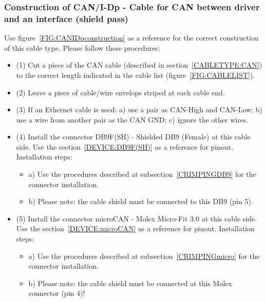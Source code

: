 \subsubsection{Construction of CAN/I-Dp - Cable for CAN between driver and an interface (shield pass)} \label{CONSTRUCTION:CANIDp}
Use figure~\ref{FIG:CANIDpconstruction} as a reference for the correct construction of this cable type. Please follow these procedures:
\begin{itemize}
  \item (1) Cut a piece of the CAN cable (described in section~\ref{CABLETYPE:CAN}) to the correct length indicated in the cable list (figure~\ref{FIG:CABLELIST}).
  \item (2) Leave a piece of cable/wire envelops striped at each cable end.
  \item (3) If an Ethernet cable is used: a) use a pair as CAN-High and CAN-Low; b) use a wire from another pair as the CAN GND; c) ignore the other wires.
  \item (4) Install the connector DB9F(SH) - Shielded DB9 (Female) at this cable side. Use the section~\ref{DEVICE:DB9F(SH)} as a reference for pinout. Installation steps:
  \begin{itemize}
    \item a) Use the procedures described at subsection~\ref{CRIMPINGDB9} for the connector installation.
    \item b) Please note: the cable shield must be connected to this DB9 (pin 5).
  \end{itemize}
  \item (5) Install the connector microCAN - Molex Micro-Fit 3.0 at this cable side. Use the section~\ref{DEVICE:microCAN} as a reference for pinout. Installation steps:
  \begin{itemize}
    \item a) Use the procedures described at subsection~\ref{CRIMPINGmicro} for the connector installation.
    \item b) Please note: the cable shield must be connected at this Molex connector (pin 4)!
  \end{itemize}
\end{itemize}
